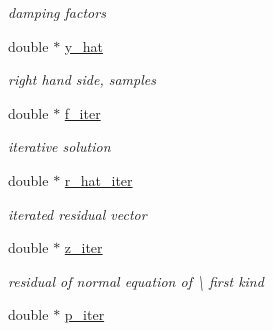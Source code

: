\begin{DoxyCompactItemize}
\begin{DoxyCompactList}\small\item\em damping factors \end{DoxyCompactList}\item 
\hypertarget{structinfct__adjoint__plan_a4a98ec178d9d74dab4e617beebc419a6}{double $\ast$ \hyperlink{structinfct__adjoint__plan_a4a98ec178d9d74dab4e617beebc419a6}{y\-\_\-hat}}\label{structinfct__adjoint__plan_a4a98ec178d9d74dab4e617beebc419a6}

\begin{DoxyCompactList}\small\item\em right hand side, samples \end{DoxyCompactList}\item 
\hypertarget{structinfct__adjoint__plan_af72ea2aed94d3e789dd064776fdf2919}{double $\ast$ \hyperlink{structinfct__adjoint__plan_af72ea2aed94d3e789dd064776fdf2919}{f\-\_\-iter}}\label{structinfct__adjoint__plan_af72ea2aed94d3e789dd064776fdf2919}

\begin{DoxyCompactList}\small\item\em iterative solution \end{DoxyCompactList}\item 
\hypertarget{structinfct__adjoint__plan_a3bb77b67c3779716d767e76b8661efbc}{double $\ast$ \hyperlink{structinfct__adjoint__plan_a3bb77b67c3779716d767e76b8661efbc}{r\-\_\-hat\-\_\-iter}}\label{structinfct__adjoint__plan_a3bb77b67c3779716d767e76b8661efbc}

\begin{DoxyCompactList}\small\item\em iterated residual vector \end{DoxyCompactList}\item 
\hypertarget{structinfct__adjoint__plan_a5b1da212f8c15d7ca209dbe347a5ec8f}{double $\ast$ \hyperlink{structinfct__adjoint__plan_a5b1da212f8c15d7ca209dbe347a5ec8f}{z\-\_\-iter}}\label{structinfct__adjoint__plan_a5b1da212f8c15d7ca209dbe347a5ec8f}

\begin{DoxyCompactList}\small\item\em residual of normal equation of \textbackslash{} first kind \end{DoxyCompactList}\item 
\hypertarget{structinfct__adjoint__plan_a6c81df2130d05bcbbcd6646cd27b671e}{double $\ast$ \hyperlink{structinfct__adjoint__plan_a6c81df2130d05bcbbcd6646cd27b671e}{p\-\_\-iter}}\label{structinfct__adjoint__plan_a6c81df2130d05bcbbcd6646cd27b671e}


\end{DoxyCompactItemize}
